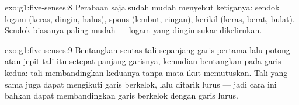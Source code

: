 \begin{solution}{exo:g1:five-senses:8}
Perabaan saja sudah mudah menyebut ketiganya: sendok logam (keras,
dingin, halus), spons (lembut, ringan), kerikil (keras, berat, bulat).
Sendok biasanya paling mudah --- logam yang dingin sukar dikelirukan.
\end{solution}

\begin{solution}{exo:g1:five-senses:9}
Bentangkan seutas tali sepanjang garis pertama lalu potong atau jepit
tali itu setepat panjang garisnya, kemudian bentangkan pada garis
kedua: tali membandingkan keduanya tanpa mata ikut memutuskan. Tali
yang sama juga dapat mengikuti garis berkelok, lalu ditarik lurus ---
jadi cara ini bahkan dapat membandingkan garis berkelok dengan garis
lurus.
\end{solution}
